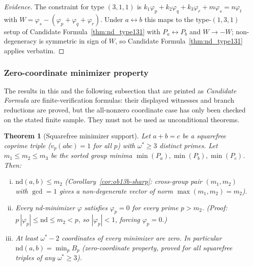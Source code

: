 \documentclass[12pt]{article}
\newtheorem{theorem}{Theorem}
\theoremstyle{definition}
\begin{document}
\begin{proof}[Evidence]
  The constraint for type $(3,1,1)$ is
  $k_1\varphi_p + k_2\varphi_q + k_3\varphi_r + m\varphi_s = n\varphi_t$ with
  $W = \varphi_s - (\varphi_p+\varphi_q+\varphi_r)$.  Under $a \leftrightarrow b$
  this maps to the type-$(1,3,1)$ setup of Candidate Formula~\ref{thm:nd_type131} with
  $P_a \leftrightarrow P_b$ and $W \to -W$; non-degeneracy is symmetric in sign of $W$,
  so Candidate Formula~\ref{thm:nd_type131} applies verbatim.
\end{proof}

\subsubsection*{Zero-coordinate minimizer property}

The results in this and the following subsection that are printed as
\emph{Candidate Formula} are finite-verification formulas: their displayed
witnesses and branch reductions are proved, but the all-nonzero coordinate
case has only been checked on the stated finite sample.  They must not be
used as unconditional theorems.

\begin{theorem}[Squarefree minimizer support]\label{thm:nd_sqfree_support}
  Let $a+b=c$ be a \emph{squarefree} coprime triple ($v_p(abc)=1$ for all $p$)
  with $\omega^*\ge 3$ distinct primes.  Let
  $m_1 \le m_2 \le m_3$ be the sorted group minima
  $\min(P_a),\min(P_b),\min(P_c)$.  Then:
  \begin{enumerate}[(i)]
    \item $\mathrm{nd}(a,b) \le m_2$ (Corollary~\ref{cor:ob13b-sharp}: cross-group
      pair $(m_1, m_2)$ with $\gcd=1$ gives a non-degenerate vector of norm
      $\max(m_1, m_2) = m_2$).
    \item Every nd-minimizer $\varphi$ satisfies $\varphi_p = 0$ for every prime
      $p > m_2$.  (Proof: $p\,|\varphi_p| \le \mathrm{nd} \le m_2 < p$, so
      $|\varphi_p| < 1$, forcing $\varphi_p = 0$.)
    \item At least $\omega^*-2$ coordinates of every minimizer are zero.
      In particular $\mathrm{nd}(a,b) = \min_p B_p$ (zero-coordinate property,
      proved for all squarefree triples of any $\omega^*\ge 3$).
  \end{enumerate}
\end{theorem}
\end{document}
